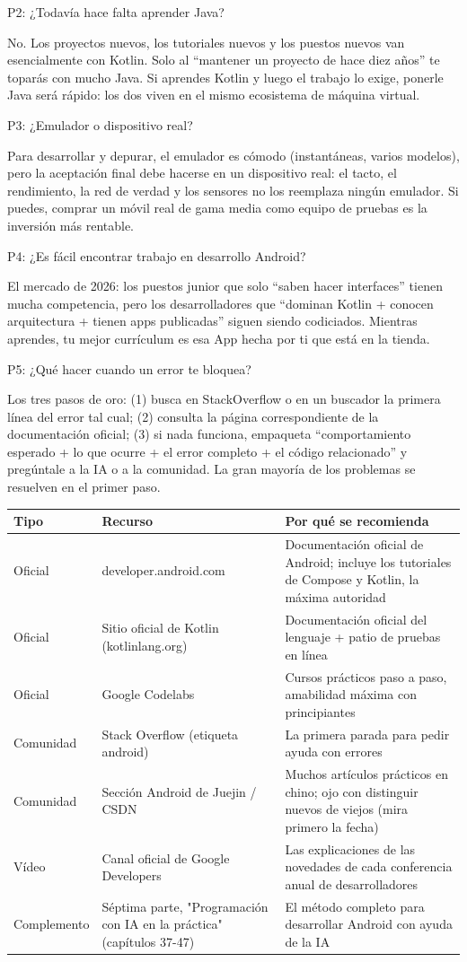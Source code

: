 P2: ¿Todavía hace falta aprender Java?

No. Los proyectos nuevos, los tutoriales nuevos y los puestos nuevos van esencialmente con Kotlin. Solo al “mantener un proyecto de hace diez años” te toparás con mucho Java. Si aprendes Kotlin y luego el trabajo lo exige, ponerle Java será rápido: los dos viven en el mismo ecosistema de máquina virtual.

P3: ¿Emulador o dispositivo real?

Para desarrollar y depurar, el emulador es cómodo (instantáneas, varios modelos), pero la aceptación final debe hacerse en un dispositivo real: el tacto, el rendimiento, la red de verdad y los sensores no los reemplaza ningún emulador. Si puedes, comprar un móvil real de gama media como equipo de pruebas es la inversión más rentable.

P4: ¿Es fácil encontrar trabajo en desarrollo Android?

El mercado de 2026: los puestos junior que solo “saben hacer interfaces” tienen mucha competencia, pero los desarrolladores que “dominan Kotlin + conocen arquitectura + tienen apps publicadas” siguen siendo codiciados. Mientras aprendes, tu mejor currículum es esa App hecha por ti que está en la tienda.

P5: ¿Qué hacer cuando un error te bloquea?

Los tres pasos de oro: (1) busca en StackOverflow o en un buscador la primera línea del error tal cual; (2) consulta la página correspondiente de la documentación oficial; (3) si nada funciona, empaqueta “comportamiento esperado + lo que ocurre + el error completo + el código relacionado” y pregúntale a la IA o a la comunidad. La gran mayoría de los problemas se resuelven en el primer paso.


\begin{center}
\begin{tabularx}{\linewidth}{|X|X|X|}
\hline
\textbf{Tipo} & \textbf{Recurso} & \textbf{Por qué se recomienda} \tabularnewline
\hline
Oficial & developer.android.com & Documentación oficial de Android; incluye los tutoriales de Compose y Kotlin, la máxima autoridad \tabularnewline
Oficial & Sitio oficial de Kotlin (kotlinlang.org) & Documentación oficial del lenguaje + patio de pruebas en línea \tabularnewline
Oficial & Google Codelabs & Cursos prácticos paso a paso, amabilidad máxima con principiantes \tabularnewline
Comunidad & Stack Overflow (etiqueta android) & La primera parada para pedir ayuda con errores \tabularnewline
Comunidad & Sección Android de Juejin / CSDN & Muchos artículos prácticos en chino; ojo con distinguir nuevos de viejos (mira primero la fecha) \tabularnewline
Vídeo & Canal oficial de Google Developers & Las explicaciones de las novedades de cada conferencia anual de desarrolladores \tabularnewline
Complemento & Séptima parte, "Programación con IA en la práctica" (capítulos 37-47) & El método completo para desarrollar Android con ayuda de la IA \tabularnewline
\hline
\end{tabularx}
\end{center}

